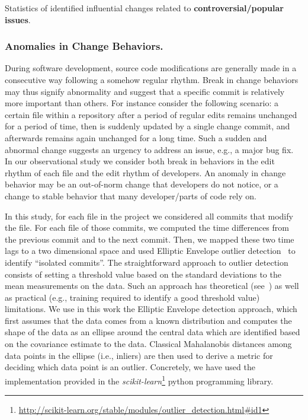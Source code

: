 \begin{table}[h!]
\centering
\caption{Statistics of identified influential changes related to {\bf controversial/popular issues}.}

\label{tab:blocking}
\end{table}


\subsubsection{Anomalies in Change Behaviors.}
\label{sec:isolated}

During software development, source code modifications
are generally made in a consecutive way following a somehow regular rhythm.
Break in change behaviors may thus signify abnormality and suggest
that a specific commit is relatively more important than others. 
For instance consider the following scenario: a certain file within a repository
after a period of regular edits remains unchanged for a period
of time, then is suddenly updated by a single change commit, and afterwards
remains again unchanged for a long time. Such a sudden and abnormal change 
suggests an urgency to address an issue, e.g., a major bug fix.
In our observational study we consider both break in behaviors in the edit rhythm
of each file and the edit rhythm of developers.
An anomaly in change behavior may be an out-of-norm change that developers do not notice,
 or a change to stable behavior that many developer/parts of code rely on.

In this study, for each file in the project we considered all commits that
modify the file. For each file of those commits, we computed the time differences
from the previous commit and to the next commit. Then, we mapped these two time
lags to a two dimensional space and used Elliptic Envelope outlier detection~\cite{rousseeuw1999fast} to
identify ``isolated commits''. The straightforward approach to outlier detection consists
of setting a threshold value based on the standard deviations to the mean measurements on the data. Such
an approach has theoretical (see~\cite{LEYS2013764}) as well as practical (e.g., training required to identify a good threshold value) limitations. We use in this work the Elliptic Envelope detection approach, which first assumes that the data comes from a known distribution and computes the shape of the data as an ellipse around the central data which are 
identified based on the covariance estimate to the data. Classical Mahalanobis distances among data points in
the ellipse (i.e., inliers) are then used to derive a metric for deciding which data point is an outlier. 
Concretely, we have used the implementation provided in the {\em scikit-learn}\footnote{\url{http://scikit-learn.org/stable/modules/outlier\_detection.html\#id1}} python programming library.

